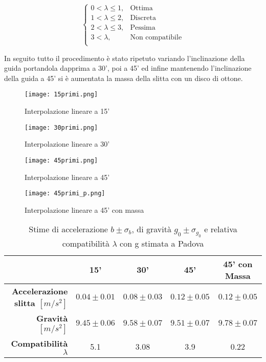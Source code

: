 \documentclass[a4paper,11pt,oneside]{article}
\begin{document}
\begin{equation*}\label{eq:cases}
    \begin{cases}
    0<\lambda\leq1, & \text{Ottima}\\
    1<\lambda\leq2, & \text{Discreta}\\
    2<\lambda\leq3, & \text{Pessima}\\
    3<\lambda, & \text{Non compatibile}\\
    \end{cases}
\end{equation*}




In seguito tutto il procedimento è stato ripetuto variando l'inclinazione della guida portandola dapprima a 30', poi a 45' ed infine mantenendo l'inclinazione della guida a 45' si è aumentata la massa della slitta con un disco di ottone.\\


  


\begin{figure}[h]
    \caption{Interpolazione lineare a 15'}
    \label{fig:g_0_15}
    \centering
           \texttt{[image: 15primi.png]}
\end{figure}

\begin{figure}[h]
    \caption{Interpolazione lineare a 30'}
    \label{fig:g_0_30}
    \centering
           \texttt{[image: 30primi.png]}
\end{figure}

\begin{figure}[h]
    \caption{Interpolazione lineare a 45'}
    \label{fig:g_0_45}
    \centering
           \texttt{[image: 45primi.png]}
\end{figure}

\begin{figure}[h]
    \caption{Interpolazione lineare a 45' con massa}
    \label{fig:g_0_p45}
    \centering
           \texttt{[image: 45primi\_p.png]}
\end{figure}



\begin{table}[]
\caption{Stime di accelerazione $b\pm \sigma_{b}$, di gravità $g_{0} \pm \sigma_{g_{0}}$ e relativa compatibilità $\lambda$ con g stimata a Padova}
\label{tab:stima_b_g}
\begin{tabular}{r|c|c|c|c}
\hline
\multicolumn{1}{l|}{}  & \textbf{15'}              & \textbf{30'}              & \textbf{45'}              & \textbf{45' con Massa}    \\ \hline
\textbf{Accelerazione slitta $[\si{m/s^2}]$} & $0.04\pm0.01$    & $0.08\pm0.03$   & $0.12\pm0.05$    & $0.12\pm0.05$    \\
\textbf{Gravità $[\si{m/s^2}]$}       & $9.45\pm0.06$ & $9.58\pm0.07$ & $9.51\pm0.07$ & $9.78\pm0.07$ \\ 
\textbf{Compatibilità $\lambda$}              &5.1                &3.08           &3.9            &0.22\\ \hline
\end{tabular}
\end{table}
\end{document}
